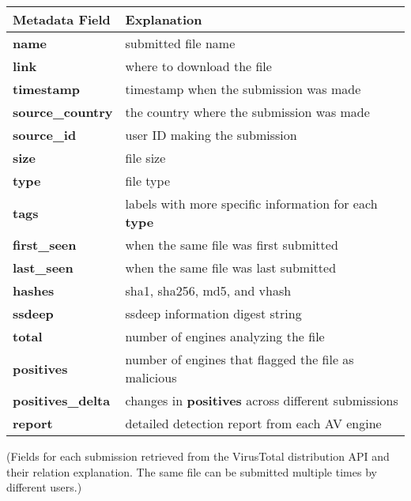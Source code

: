 
\begin{table}[h!]
\centering
\footnotesize
{
\begin{tabular}{l|l}
\hline
Metadata Field & Explanation \\
\hline                            
{\bf name}      & submitted file name \\
{\bf link}      & where to download the file \\
{\bf timestamp} & timestamp when the submission was made \\
{\bf source\_country} & the country where the submission was made \\
{\bf source\_id} & user ID making the submission\\
{\bf size} & file size \\
{\bf type} & file type \\
{\bf tags} & labels with more specific information for each {\bf type}\\
{\bf first\_seen} & when the same file was first submitted \\
{\bf last\_seen} & when the same file was last submitted \\
{\bf hashes} & sha1, sha256, md5, and vhash\\
{\bf ssdeep} & ssdeep information digest string \\
{\bf total} & number of engines analyzing the file \\
{\bf positives} & number of engines that flagged the file as malicious \\
{\bf positives\_delta} & changes in {\bf positives} across different submissions\\
{\bf report} & detailed detection report from each AV engine \\
\hline

\end{tabular}
}
{\footnotesize{(Fields for each submission retrieved from the VirusTotal distribution API and their relation explanation.
The same file can be submitted multiple times by different users.)}}
\end{table}


